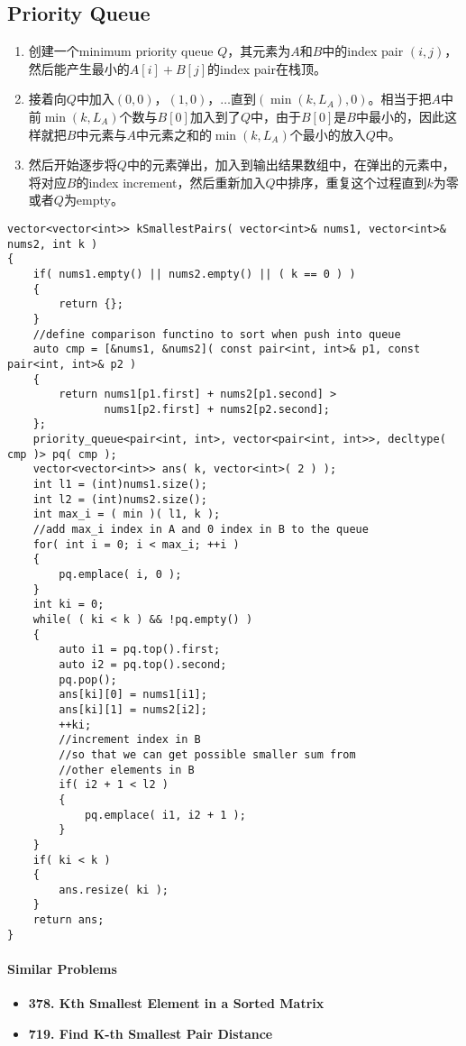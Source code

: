 \subsection{Priority Queue}
\begin{enumerate}
\item 创建一个minimum priority queue $ Q $，其元素为$A$和$B$中的index pair $ (i,j) $，然后能产生最小的$A[i]+B[j]$的index pair在栈顶。
\item 接着向$Q$中加入$(0,0)$，$ (1,0) $，$\ldots$直到$(\min(k, L_A),0)$。相当于把$A$中前$\min(k, L_A)$个数与$B[0]$加入到了$Q$中，由于$B[0]$是$B$中最小的，因此这样就把$B$中元素与$A$中元素之和的$\min(k, L_A)$个最小的放入$ Q $中。
\item 然后开始逐步将$Q$中的元素弹出，加入到输出结果数组中，在弹出的元素中，将对应$B$的index increment，然后重新加入$Q$中排序，重复这个过程直到$k$为零或者$Q$为empty。
\end{enumerate}

\setcounter{lstlisting}{0}
\begin{lstlisting}[style=customc, caption={Priority Queue}]
vector<vector<int>> kSmallestPairs( vector<int>& nums1, vector<int>& nums2, int k )
{
    if( nums1.empty() || nums2.empty() || ( k == 0 ) )
    {
        return {};
    }
    //define comparison functino to sort when push into queue
    auto cmp = [&nums1, &nums2]( const pair<int, int>& p1, const pair<int, int>& p2 )
    {
        return nums1[p1.first] + nums2[p1.second] >
               nums1[p2.first] + nums2[p2.second];
    };
    priority_queue<pair<int, int>, vector<pair<int, int>>, decltype( cmp )> pq( cmp );
    vector<vector<int>> ans( k, vector<int>( 2 ) );
    int l1 = (int)nums1.size();
    int l2 = (int)nums2.size();
    int max_i = ( min )( l1, k );
    //add max_i index in A and 0 index in B to the queue
    for( int i = 0; i < max_i; ++i )
    {
        pq.emplace( i, 0 );
    }
    int ki = 0;
    while( ( ki < k ) && !pq.empty() )
    {
        auto i1 = pq.top().first;
        auto i2 = pq.top().second;
        pq.pop();
        ans[ki][0] = nums1[i1];
        ans[ki][1] = nums2[i2];
        ++ki;
        //increment index in B
        //so that we can get possible smaller sum from
        //other elements in B
        if( i2 + 1 < l2 )
        {
            pq.emplace( i1, i2 + 1 );
        }
    }
    if( ki < k )
    {
        ans.resize( ki );
    }
    return ans;
}
\end{lstlisting}

\paragraph{Similar Problems}
\begin{itemize}
\item \textbf{378. Kth Smallest Element in a Sorted Matrix}
\item \textbf{719. Find K-th Smallest Pair Distance}
\end{itemize}